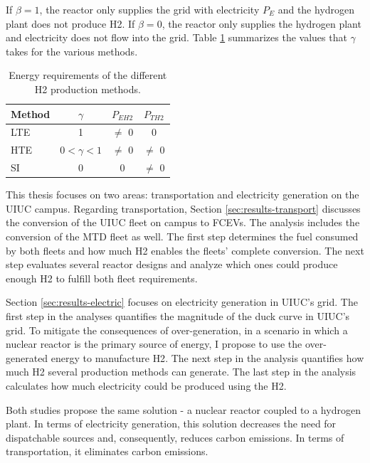 If $\beta = 1$, the reactor only supplies the grid with electricity $P_E$ and the hydrogen plant does not produce \gls{H2}.
If $\beta = 0$, the reactor only supplies the hydrogen plant and electricity does not flow into the grid.
Table \ref{tab:cogen1} summarizes the values that $\gamma$ takes for the various methods.

\begin{table}[htbp!]
    \centering
    \caption{Energy requirements of the different \gls{H2} production methods.}
    \begin{tabular}{lccc}
    \toprule
    Method    & $\gamma$         & $P_{EH2}$ & $P_{TH2}$ \\
	\midrule
    LTE & 1                & $\ne$ 0   & 0         \\
    HTE & $0 < \gamma < 1$ & $\ne$ 0   & $\ne$ 0   \\
    SI  & 0                & 0         & $\ne$ 0   \\
    \bottomrule
    \end{tabular}
    \label{tab:cogen1}
\end{table}


This thesis focuses on two areas: transportation and electricity generation on the \gls{UIUC} campus.
Regarding transportation, Section \ref{sec:results-transport} discusses the conversion of the \gls{UIUC} fleet on campus to \glspl{FCEV}.
The analysis includes the conversion of the \gls{MTD} fleet as well.
The first step determines the fuel consumed by both fleets and how much \gls{H2} enables the fleets' complete conversion.
The next step evaluates several reactor designs and analyze which ones could produce enough \gls{H2} to fulfill both fleet requirements.

Section \ref{sec:results-electric} focuses on electricity generation in UIUC's grid.
The first step in the analyses quantifies the magnitude of the duck curve in UIUC's grid.
To mitigate the consequences of over-generation, in a scenario in which a nuclear reactor is the primary source of energy, I propose to use the over-generated energy to manufacture \gls{H2}.
The next step in the analysis quantifies how much \gls{H2} several production methods can generate.
The last step in the analysis calculates how much electricity could be produced using the \gls{H2}.

Both studies propose the same solution - a nuclear reactor coupled to a hydrogen plant.
In terms of electricity generation, this solution decreases the need for dispatchable sources and, consequently, reduces carbon emissions.
In terms of transportation, it eliminates carbon emissions.

